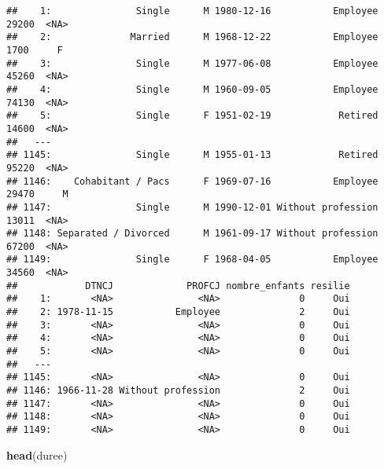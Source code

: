 \documentclass[
]{article}
\newenvironment{Shaded}{\begin{snugshade}}{\end{snugshade}}
\newcommand{\CommentTok}[1]{\textcolor[rgb]{0.56,0.35,0.01}{\textit{#1}}}
\newcommand{\DataTypeTok}[1]{\textcolor[rgb]{0.13,0.29,0.53}{#1}}
\newcommand{\KeywordTok}[1]{\textcolor[rgb]{0.13,0.29,0.53}{\textbf{#1}}}
\newcommand{\NormalTok}[1]{#1}
\newcommand{\OperatorTok}[1]{\textcolor[rgb]{0.81,0.36,0.00}{\textbf{#1}}}
\newcommand{\StringTok}[1]{\textcolor[rgb]{0.31,0.60,0.02}{#1}}
\begin{document}
\begin{verbatim}
##    1:               Single      M 1980-12-16           Employee 29200  <NA>
##    2:              Married      M 1968-12-22           Employee  1700     F
##    3:               Single      M 1977-06-08           Employee 45260  <NA>
##    4:               Single      M 1960-09-05           Employee 74130  <NA>
##    5:               Single      F 1951-02-19            Retired 14600  <NA>
##   ---                                                                      
## 1145:               Single      M 1955-01-13            Retired 95220  <NA>
## 1146:    Cohabitant / Pacs      F 1969-07-16           Employee 29470     M
## 1147:               Single      M 1990-12-01 Without profession 13011  <NA>
## 1148: Separated / Divorced      M 1961-09-17 Without profession 67200  <NA>
## 1149:               Single      F 1968-04-05           Employee 34560  <NA>
##            DTNCJ             PROFCJ nombre_enfants resilie
##    1:       <NA>               <NA>              0     Oui
##    2: 1978-11-15           Employee              2     Oui
##    3:       <NA>               <NA>              0     Oui
##    4:       <NA>               <NA>              0     Oui
##    5:       <NA>               <NA>              0     Oui
##   ---                                                     
## 1145:       <NA>               <NA>              0     Oui
## 1146: 1966-11-28 Without profession              2     Oui
## 1147:       <NA>               <NA>              0     Oui
## 1148:       <NA>               <NA>              0     Oui
## 1149:       <NA>               <NA>              0     Oui
\end{verbatim}

\begin{Shaded}
\end{Shaded}

\begin{Shaded}
\begin{Highlighting}[]
\KeywordTok{head}\NormalTok{(duree)}
\end{Highlighting}
\end{Shaded}
\end{document}
